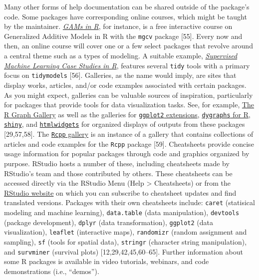 \documentclass[10pt,letterpaper]{article}
\begin{document}
Many other forms of help documentation can be shared outside of the
package's code. Some packages have corresponding online courses, which
might be taught by the maintainer.
\href{https://noamross.github.io/gams-in-r-course/}{\emph{GAMs in R}},
for instance, is a free interactive course on Generalized Additive
Models in R with the \texttt{mgcv} package {[}55{]}. Every now and then,
an online course will cover one or a few select packages that revolve
around a central theme such as a types of modeling. A suitable example,
\href{https://supervised-ml-course.netlify.app/}{\emph{Supervised
Machine Learning Case Studies in R}}, features several \texttt{tidy}
tools with a primary focus on \texttt{tidymodels} {[}56{]}. Galleries,
as the name would imply, are sites that display works, articles, and/or
code examples associated with certain packages. As you might expect,
galleries can be valuable sources of inspiration, particularly for
packages that provide tools for data visualization tasks. See, for
example, \href{https://www.r-graph-gallery.com/}{The R Graph Gallery} as
well as the galleries for
\href{https://exts.ggplot2.tidyverse.org/gallery/}{\texttt{ggplot2}
extensions},
\href{https://rstudio.github.io/dygraphs/index.html}{\texttt{dygraphs}
for R}, \href{https://shiny.rstudio.com/gallery/}{\texttt{shiny}}, and
\href{https://gallery.htmlwidgets.org/}{\texttt{htmlwidgets}} for
organized displays of outputs from these packages {[}29,57,58{]}. The
\href{https://gallery.rcpp.org/}{\texttt{Rcpp} gallery} is an instance
of a gallery that contains collections of articles and code examples for
the \texttt{Rcpp} package {[}59{]}. Cheatsheets provide concise usage
information for popular packages through code and graphics organized by
purpose. RStudio hosts a number of these, including cheatsheets made by
RStudio's team and those contributed by others. These cheatsheets can be
accessed directly via the RStudio Menu (Help \textgreater{} Cheatsheets)
or from the \href{https://rstudio.com/resources/cheatsheets/}{RStudio
website} on which you can subscribe to cheatsheet updates and find
translated versions. Packages with their own cheatsheets include:
\texttt{caret} (statisical modeling and machine learning),
\texttt{data.table} (data manipulation), \texttt{devtools} (package
development), \texttt{dplyr} (data transformation), \texttt{ggplot2}
(data visualization), \texttt{leaflet} (interactive maps),
\texttt{randomizr} (random assignment and sampling), \texttt{sf} (tools
for spatial data), \texttt{stringr} (character string manipulation), and
\texttt{survminer} (survival plots) {[}12,29,42,45,60--65{]}. Further
information about some R packages is available in video tutorials,
webinars, and code demonstrations (i.e., ``demos'').
\end{document}
